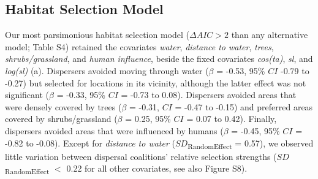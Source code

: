 \documentclass[abstract=on,10pt,a4paper,bibliography=totocnumbered]{article}
\begin{document}
\subsection{Habitat Selection Model}
Our most parsimonious habitat selection model (\(\Delta AIC > 2\) than any
alternative model; Table S4) retained the covariates \textit{water},
\textit{distance to water}, \textit{trees}, \textit{shrubs/grassland}, and
\textit{human influence}, beside the fixed covariates \textit{cos(ta)},
\textit{sl}, and \textit{log(sl)} (a). Dispersers
avoided moving through water (\(\beta\) = -0.53, 95\% \(CI\) -0.79 to -0.27) but
selected for locations in its vicinity, although the latter effect was not
significant (\(\beta\) = -0.33, 95\% \(CI\) = -0.73 to 0.08). Dispersers avoided
areas that were densely covered by trees (\(\beta\) = -0.31, \(CI\) = -0.47 to
-0.15) and preferred areas covered by shrubs/grassland (\(\beta\) = 0.25, 95\%
\(CI\) = 0.07 to 0.42). Finally, dispersers avoided areas that were influenced
by humans (\(\beta\) = -0.45, 95\% \(CI\) = -0.82 to -0.08). Except for
\textit{distance to water} (\(SD\)\textsubscript{RandomEffect} = 0.57), we
observed little variation between dispersal coalitions' relative selection
strengths (\(SD\)\textsubscript{RandomEffect} \(<\) 0.22 for all other
covariates, see also Figure S8).
\end{document}
